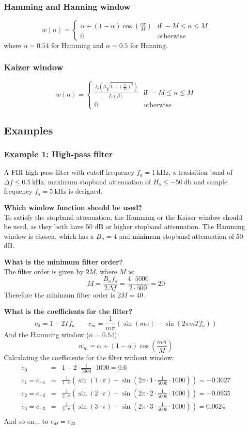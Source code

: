 \subsubsection{Hamming and Hanning window}
$$w(n)=\begin{cases}
\alpha+(1-\alpha)\cos\left(\frac{n\pi}{M}\right) & \text{if } -M\leq n\leq M\\
0 & \text{otherwise}
\end{cases}$$
where $\alpha=0.54$ for Hamming and $\alpha=0.5$ for Hanning.
\subsubsection{Kaizer window}
$$w(n)=\begin{cases}
  \frac{I_0\left(\beta\sqrt{1-\left(\frac{n}{M}\right)^{2}}\right)}{I_0(\beta)}& \text{if } -M\leq n\leq M\\
0 & \text{otherwise}
\end{cases}$$

\subsection{Examples}
\subsubsection{Example 1: High-pass filter}
A FIR high-pass filter with cutoff frequency $f_{a}=\SI{1}{\kilo\hertz}$, a trasisition band of $\Delta f\leq\SI{0.5}{\kilo\hertz}$, maximum stopband attenuation of $H_s\leq\SI{-50}{\decibel}$ and sample frequency $f_s=\SI{5}{\kilo\hertz}$ is designed.

\textbf{Which window function should be used?}\\
To satisfy the stopband attenuation, the Hamming or the Kaiser window should be used, as they both have 50 dB or higher stopband attenuation.
The Hamming window is chosen, which has a $B_n=4$ and minimum stopband attenuation of 50 dB.

\textbf{What is the minimum filter order?}\\
The filter order is given by $2M$, where $M$ is:
$$M=\frac{B_nf_s}{2\Delta f}=\frac{4\cdot5000}{2\cdot 500}=20$$
Therefore the minimum filter order is $2M=40$.

\textbf{What is the coefficients for the filter?}
$$c_0=1-2Tf_a\qquad c_m=\frac{1}{m\pi}(\sin(m\pi)-\sin(2\pi m T f_{a}))$$
And the Hamming window ($\alpha=0.54$):
$$w_m=\alpha+(1-\alpha)\cos\left(\frac{m\pi}{M}\right)$$
Calculating the coefficients for the filter without window:
\begin{eqnarray*}
c_0&=&1-2\cdot\frac{1}{5000}\cdot1000=0.6\\
c_1=c_{-1}&=&\frac{1}{1\cdot\pi}\left(\sin(1\cdot\pi)-\sin(2\pi\cdot 1\cdot\frac{1}{5000}\cdot1000)\right)=-0.3027\\
c_2=c_{-2}&=&\frac{1}{2\cdot\pi}\left(\sin(2\cdot\pi)-\sin(2\pi\cdot 2\cdot\frac{1}{5000}\cdot1000)\right)=-0.0935\\
c_3=c_{-3}&=&\frac{1}{3\cdot\pi}\left(\sin(3\cdot\pi)-\sin(2\pi\cdot 3\cdot\frac{1}{5000}\cdot1000)\right)=0.0624\\
\end{eqnarray*}
And so on... to $c_M=c_{20}$

